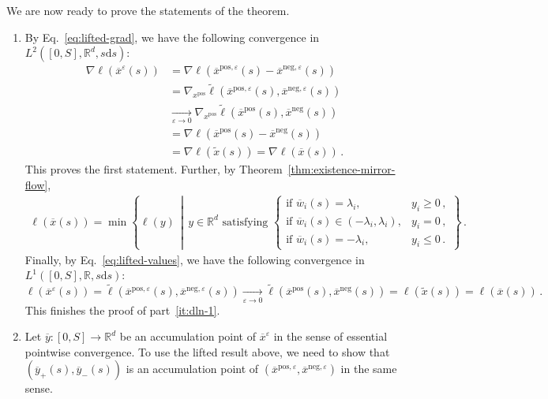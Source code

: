 \documentclass[11pt,english,reqno]{article}
\newcommand{\diff}{\mathrm{d}}
\newcommand{\R}{\mathbb{R}}
\newcommand{\pos}{\text{pos}}
\renewcommand{\neg}{\text{neg}}
\renewcommand{\leq}{\leqslant}
\renewcommand{\geq}{\geqslant}
\theoremstyle{plain}
\theoremstyle{definition}
\theoremstyle{remark}
\numberwithin{equation}{section}
\begin{document}
We are now ready to prove the statements of the theorem.
\begin{enumerate}[label=(\alph*)]
	\item By Eq.~\eqref{eq:lifted-grad}, we have the following convergence in $L^2([0,S], \R^d, s\diff s)$:
	\begin{align*}
		\nabla \ell(\overline{x}^\varepsilon(s))
		&= \nabla \ell(\overline{x}^{\pos, \varepsilon}(s) - \overline{x}^{\neg, \varepsilon}(s)) \\
		&= \nabla_{x^\pos} \widetilde{\ell}(\overline{x}^{\pos, \varepsilon}(s), \overline{x}^{\neg, \varepsilon}(s)) \\
		&\xrightarrow[\varepsilon\to 0]{} \nabla_{x^\pos} \widetilde{\ell}(\overline{x}^{\pos}(s), \overline{x}^{\neg}(s)) \\
		&= \nabla \ell(\overline{x}^\pos(s) - \overline{x}^\neg(s)) \\
		&= \nabla \ell(\widetilde{x}(s)) = \nabla \ell(\overline{x}(s)) \, .
	\end{align*}
	This proves the first statement. Further, by Theorem~\ref{thm:existence-mirror-flow},
	\begin{align*}
		\ell(\overline{x}(s)) = \min \left\{\ell(y)\,\middle|\, y\in \R^d \text{ satisfying }\begin{cases}
		\text{if }\overline{w}_i(s) = \lambda_i, & y_i \geq 0 \, , \\
		\text{if }\overline{w}_i(s) \in (-\lambda_i, \lambda_i), & y_i = 0 \, , \\
		\text{if }\overline{w}_i(s) = -\lambda_i, & y_i \leq 0 \, .
		\end{cases}\right\}  \, .  
	\end{align*}
	Finally, by Eq.~\eqref{eq:lifted-values}, we have the following convergence in $L^1([0,S], \R, s\diff s)$:
	\begin{equation*}
		\ell(\overline{x}^\varepsilon(s)) = \widetilde{\ell}(\overline{x}^{\pos, \varepsilon}(s), \overline{x}^{\neg, \varepsilon}(s)) \xrightarrow[\varepsilon\to 0]{} \widetilde{\ell}(\overline{x}^\pos(s), \overline{x}^\neg(s)) = \ell(\widetilde{x}(s)) = \ell(\overline{x}(s)) \, .
	\end{equation*}
	This finishes the proof of part~\ref{it:dln-1}.
	\item Let $\overline{y}:[0,S]\to\R^d$ be an accumulation point of $\overline{x}^\varepsilon$ in the sense of essential pointwise convergence. To use the lifted result above, we need to show that $(\overline{y}_+(s), \overline{y}_-(s))$ is an accumulation point of $(\overline{x}^{\pos, \varepsilon},\overline{x}^{\neg, \varepsilon})$ in the same sense.
	

\end{enumerate}
\end{document}
